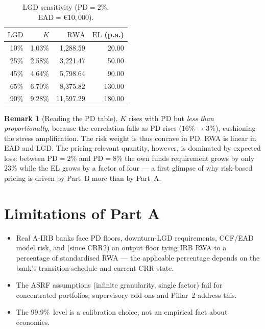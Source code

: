 \documentclass[11pt,a4paper]{report}
\renewcommand{\EUR}[1]{\euro#1}
\theoremstyle{definition}
\newtheorem{remark}[definition]{Remark}
\theoremstyle{plain}
\newcommand{\PD}{\mathrm{PD}}
\newcommand{\LGD}{\mathrm{LGD}}
\newcommand{\EAD}{\mathrm{EAD}}
\newcommand{\RWA}{\mathrm{RWA}}
\newcommand{\EL}{\mathrm{EL}}
\begin{document}
\begin{table}[htbp]
\centering
\caption{LGD sensitivity ($\PD=2\%$, $\EAD=\EUR{10{,}000}$).}
\label{tab:lgdsens}
\begin{tabular}{rrrr}
\toprule
$\LGD$ & $K$ & $\RWA$ & $\EL$ (p.a.)\\
\midrule
10\% & 1.03\% & 1{,}288.59 & 20.00\\
25\% & 2.58\% & 3{,}221.47 & 50.00\\
45\% & 4.64\% & 5{,}798.64 & 90.00\\
65\% & 6.70\% & 8{,}375.82 & 130.00\\
90\% & 9.28\% & 11{,}597.29 & 180.00\\
\bottomrule
\end{tabular}
\end{table}

\begin{remark}[Reading the PD table]
$K$ rises with $\PD$ but \emph{less than proportionally}, because the
correlation falls as $\PD$ rises ($16\%\to 3\%$), cushioning the stress
amplification. The risk weight is thus concave in $\PD$. RWA is
linear in $\EAD$ and $\LGD$. The pricing-relevant quantity, however, is
dominated by expected loss: between $\PD=2\%$ and $\PD=8\%$ the own
funds requirement grows by only $23\%$ while the EL grows by a factor
of four --- a first glimpse of why risk-based pricing is driven by
Part~B more than by Part~A.
\end{remark}

\section{Limitations of Part A}

\begin{itemize}
\item Real A-IRB banks face PD floors, downturn-LGD requirements,
      CCF/EAD model risk, and (since CRR2) an output floor tying IRB
      RWA to a percentage of standardised RWA --- the applicable
      percentage depends on the bank's transition schedule and current
      CRR state.
\item The ASRF assumptions (infinite granularity, single factor) fail
      for concentrated portfolios; supervisory add-ons and Pillar~2
      address this.
\item The 99.9\%\ level is a calibration choice, not an empirical fact
      about economies.
\end{itemize}

\end{document}
